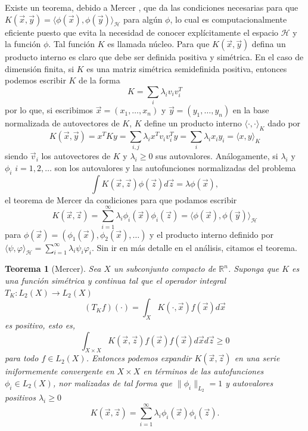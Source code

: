 \documentclass[letterpaper,12pt]{book}
\newtheorem{theorem}{Teorema}
\begin{document}
Existe un teorema, debido a Mercer \cite{mercer_functions_1909}, que da las condiciones necesarias para que $K(\vec{x},\vec{y}) = \langle\phi(\vec{x}),\phi(\vec{y})\rangle_{\mathcal{H}}$ para algún $\phi$, lo cual es computacionalmente eficiente puesto que evita la necesidad de conocer explícitamente el espacio $\mathcal{H}$ y la función $\phi$. Tal función $K$ es llamada núcleo. Para que $K(\vec{x},\vec{y})$ defina un producto interno es claro que debe ser definida positiva y simétrica. En el caso de dimensión finita, si $K$ es una matriz simétrica semidefinida positiva, entonces podemos escribir $K$ de la forma
\begin{equation}
 K =\sum_i\lambda_i v_iv_i^T
\end{equation}
por lo que, si escribimos $\vec{x} = (x_1,\dots,x_n)$ y $\vec{y}=(y_1,\dots,y_n)$ en la base normalizada de autovectores de $K$, $K$ define un producto interno $\langle\cdot,\cdot\rangle_{K}$ dado por
\begin{equation}
 K(\vec{x},\vec{y}) =x^TKy = \sum_{i,j}\lambda_ix^Tv_iv_i^Ty = \sum_i \lambda_ix_iy_i = \langle x,y\rangle_{K}
\end{equation}
siendo $\vec{v}_i$ los autovectores de $K$ y $\lambda_i\geq 0$ sus autovalores. Análogamente, si $\lambda_i$ y $\phi_i$ $i = 1,2,\dots$ son los autovalores y las autofunciones normalizadas del problema
\begin{equation}
  \int K(\vec{x},\vec{z})\phi(\vec{z})d\vec{z} = \lambda\phi(\vec{x}), 
\end{equation}
el teorema de Mercer da condiciones para que podamos escribir 
\begin{equation}
  K(\vec{x},\vec{z}) = \sum_{i=1}^{\infty}\lambda_i\phi_i(\vec{x})\phi_i(\vec{z}) =  \langle \phi(\vec{x}), \phi(\vec{y})\rangle_{\mathcal{H}}
\end{equation}
para $\phi(\vec{x}) = (\phi_1(\vec{x}), \phi_2(\vec{x}),\dots)$ y el producto interno definido por $\langle \psi,\varphi \rangle_{\mathcal{H}} = \sum_{i=1}^{\infty}\lambda_i\psi_i\varphi_i$. Sin ir en más detalle en el análisis, citamos el teorema.
\begin{theorem}[Mercer]
  Sea $X$ un subconjunto compacto de $\mathbb{R}^n$. Suponga que $K$ es una función simétrica y continua tal que el operador integral $T_K:L_2(X)\to L_2(X)$
  \begin{equation*}
    (T_Kf)(\cdot)=\int_{X}K(\cdot,\vec{x})f(\vec{x})d\vec{x}
  \end{equation*}
  es positivo, esto es,
  \begin{equation*}
    \int_{X\times X}K(\vec{x},\vec{z})f(\vec{x})f(\vec{x})d\vec{x}d\vec{z}\geq 0
  \end{equation*} 
  para todo $f\in L_2(X)$. Entonces podemos expandir $K(\vec{x},\vec{z})$ en una serie iniformemente convergente en $X\times X$ en términos de las autofunciones $\phi_i\in L_2(X)$, nor malizadas de tal forma que $\|\phi_i\|_{L_2}=1$ y autovalores positivos $\lambda_i\geq 0$
  \begin{equation*}
    K(\vec{x},\vec{z}) = \sum_{i=1}^{\infty}\lambda_i\phi_i(\vec{x})\phi_i(\vec{z}).
  \end{equation*}
\end{theorem}
\end{document}
